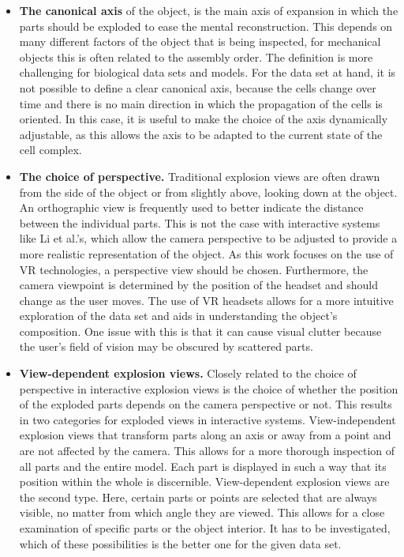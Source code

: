 \begin{itemize}
	\item \textbf{The canonical axis} of the object, is the main axis of expansion in which the parts should be exploded to ease the mental reconstruction. This depends on many different factors of the object that is being inspected, for mechanical objects this is often related to the assembly order. The definition is more challenging for biological data sets and models. For the data set at hand, it is not possible to define a clear canonical axis, because the cells change over time and there is no main direction in which the propagation of the cells is oriented. In this case, it is useful to make the choice of the axis dynamically adjustable, as this allows the axis to be adapted to the current state of the cell complex. 
	\item \textbf{The choice of perspective.} Traditional explosion views are often drawn from the side of the object or from slightly above, looking down at the object. An orthographic view is frequently used to better indicate the distance between the individual parts. 
	This is not the case with interactive systems like Li et al.'s, which allow the camera perspective to be adjusted to provide a more realistic representation of the object.\cite{Wilmot_Li_2008}
	As this work focuses on the use of VR technologies, a perspective view should be chosen. 
	Furthermore, the camera viewpoint is determined by the position of the headset and should change as the user moves. 
	The use of VR headsets allows for a more intuitive exploration of the data set and aids in understanding the object's composition. 
	One issue with this is that it can cause visual clutter because the user's field of vision may be obscured by scattered parts.
	\item \textbf{View-dependent explosion views.} Closely related to the choice of perspective in interactive explosion views is the choice of whether the position of the exploded parts depends on the camera perspective or not. 
	This results in two categories for exploded views in interactive systems.
	View-independent explosion views that transform parts along an axis or away from a point and are not affected by the camera.
	This allows for a more thorough inspection of all parts and the entire model. 
	Each part is displayed in such a way that its position within the whole is discernible.
	View-dependent explosion views are the second type.
	Here, certain parts or points are selected that are always visible, no matter from which angle they are viewed. 
	This allows for a close examination of specific parts or the object interior.
	It has to be investigated, which of these possibilities is the better one for the given data set.
\end{itemize}

